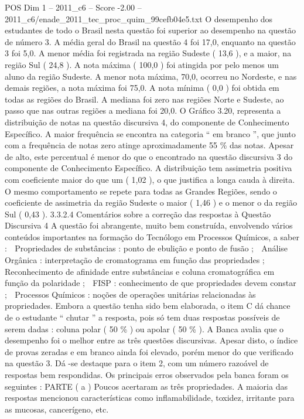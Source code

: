 \begin{textsample}{POS Dim 1 – 2011\_c6 – Score -2.00 – 2011\_c6/enade\_2011\_tec\_proc\_quim\_99cefb04e5.txt}
O desempenho dos estudantes de todo o Brasil nesta questão foi superior ao desempenho na questão de número 3.
A média geral do Brasil na questão 4 foi 17,0, enquanto na questão 3 foi 5,0.
A menor média foi registrada na região Sudeste ( 13,6 ), e a maior, na região Sul ( 24,8 ).
A nota máxima ( 100,0 ) foi atingida por pelo menos um aluno da região Sudeste.
A menor nota máxima, 70,0, ocorreu no Nordeste, e nas demais regiões, a nota máxima foi 75,0.
A nota mínima ( 0,0 ) foi obtida em todas as regiões do Brasil.
A mediana foi zero nas regiões Norte e Sudeste, ao passo que nas outras regiões a mediana foi 20,0.
O Gráfico 3.20, representa a distribuição de notas na questão discursiva 4, do componente de Conhecimento Específico.
A maior frequência se encontra na categoria “ em branco ”, que junto com a frequência de notas zero atinge aproximadamente 55 \% das notas.
Apesar de alto, este percentual é menor do que o encontrado na questão discursiva 3 do componente de Conhecimento Específico.
A distribuição tem assimetria positiva com coeficiente maior do que um ( 1,02 ), o que justifica a longa cauda à direita.
O mesmo comportamento se repete para todas as Grandes Regiões, sendo o coeficiente de assimetria da região Sudeste o maior ( 1,46 ) e o menor o da região Sul ( 0,43 ). 3.3.2.4 Comentários sobre a correção das respostas à Questão Discursiva 4 A questão foi abrangente, muito bem construída, envolvendo vários conteúdos importantes na formação do Tecnólogo em Processos Químicos, a saber :  Propriedades de substâncias : ponto de ebulição e ponto de fusão ;  Análise Orgânica : interpretação de cromatograma em função das propriedades ;  Reconhecimento de afinidade entre substâncias e coluna cromatográfica em função da polaridade ;  FISP : conhecimento de que propriedades devem constar ;  Processos Químicos : noções de operações unitárias relacionadas às propriedades.
Embora a questão tenha sido bem elaborada, o item C dá chance de o estudante “ chutar ” a resposta, pois só tem duas respostas possíveis de serem dadas : coluna polar ( 50 \% ) ou apolar ( 50 \% ).
A Banca avalia que o desempenho foi o melhor entre as três questões discursivas.
Apesar disto, o índice de provas zeradas e em branco ainda foi elevado, porém menor do que verificado na questão 3.
Dá -se destaque para o item 2, com um número razoável de respostas bem respondidas.
Os principais erros observados pela banca foram os seguintes : PARTE ( a ) Poucos acertaram as três propriedades.
A maioria das respostas mencionou características como inflamabilidade, toxidez, irritante para as mucosas, cancerígeno, etc.

\end{textsample}
